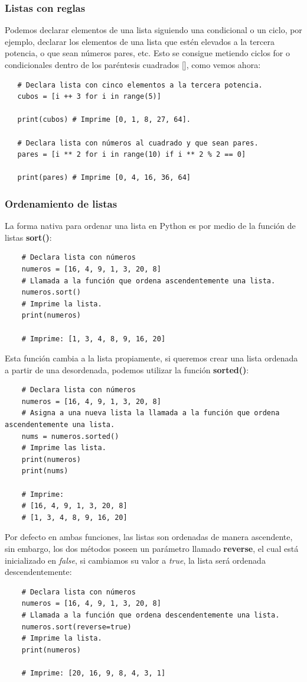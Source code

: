 \subsubsection{Listas con reglas}
\hspace{0.55cm}Podemos declarar elementos de una lista siguiendo una condicional o un ciclo, por ejemplo, declarar los elementos de una lista que estén elevados a la tercera potencia, o que sean números pares, etc. Esto se consigue metiendo ciclos for o condicionales dentro de los paréntesis cuadrados [], como vemos ahora:
\begin{lstlisting}
   # Declara lista con cinco elementos a la tercera potencia.
   cubos = [i ++ 3 for i in range(5)]
   
   print(cubos) # Imprime [0, 1, 8, 27, 64].
   
   # Declara lista con números al cuadrado y que sean pares.
   pares = [i ** 2 for i in range(10) if i ** 2 % 2 == 0]
   
   print(pares) # Imprime [0, 4, 16, 36, 64]
\end{lstlisting}


\subsubsection{Ordenamiento de listas}
\hspace{0.55cm}La forma nativa para ordenar una lista en Python es por medio de la función de listas \textbf{sort()}:
\begin{lstlisting}
	# Declara lista con números
	numeros = [16, 4, 9, 1, 3, 20, 8]
	# Llamada a la función que ordena ascendentemente una lista.
	numeros.sort()
	# Imprime la lista.
	print(numeros)
	
	# Imprime: [1, 3, 4, 8, 9, 16, 20]
\end{lstlisting}

Esta función cambia a la lista propiamente, si queremos crear una lista ordenada a partir de una desordenada, podemos utilizar la función \textbf{sorted()}:
\begin{lstlisting}
	# Declara lista con números
	numeros = [16, 4, 9, 1, 3, 20, 8]
	# Asigna a una nueva lista la llamada a la función que ordena ascendentemente una lista.
	nums = numeros.sorted()
	# Imprime las lista.
	print(numeros)
	print(nums)
	
	# Imprime:
	# [16, 4, 9, 1, 3, 20, 8]
	# [1, 3, 4, 8, 9, 16, 20]
\end{lstlisting}

Por defecto en ambas funciones, las listas son ordenadas de manera ascendente, sin embargo, los dos métodos poseen un parámetro llamado \textbf{reverse}, el cual está inicializado en \textit{false}, si cambiamos su valor a \textit{true}, la lista será ordenada descendentemente:
\begin{lstlisting}
	# Declara lista con números
	numeros = [16, 4, 9, 1, 3, 20, 8]
	# Llamada a la función que ordena descendentemente una lista.
	numeros.sort(reverse=true)
	# Imprime la lista.
	print(numeros)
	
	# Imprime: [20, 16, 9, 8, 4, 3, 1]
\end{lstlisting}

